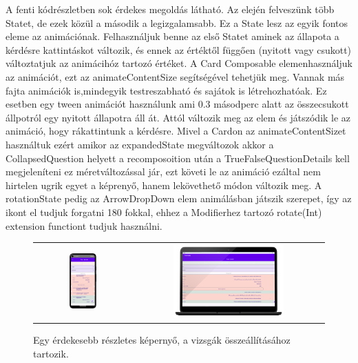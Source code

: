 A fenti kódrészletben sok érdekes megoldás látható.
Az elején felveszünk több Statet, de ezek közül a második a legizgalamsabb. Ez a State lesz az egyik fontos eleme az animációnak.
Felhasználjuk benne az első Statet aminek az állapota a kérdésre kattintáskot változik, és ennek az értéktől függően (nyitott vagy csukott) változtatjuk az animácihóz tartozó értéket.
A Card Composable elemenhasználjuk az animációt, ezt az animateContentSize segítségével tehetjük meg.
Vannak más fajta animációk is,mindegyik testreszabható és sajátok is létrehozhatóak. Ez esetben egy tween animációt használunk ami 0.3 másodperc alatt az összecsukott állpotról egy nyitott állapotra áll át.
Attól változik meg az elem és játszódik le az animáció, hogy rákattintunk a kérdésre.
Mivel a Cardon az animateContentSizet használtuk ezért amikor az expandedState megváltozok akkor a CollapsedQuestion helyett a recomposoition után a TrueFalseQuestionDetails kell megjeleníteni ez méretváltozással jár, ezt követi le az animáció ezáltal nem hirtelen ugrik egyet a képrenyő, hanem lekövethető módon változik meg.
A rotationState pedig az ArrowDropDown elem animálásban játszik szerepet, így az ikont el tudjuk forgatni 180 fokkal, ehhez a Modifierhez tartozó rotate(Int) extension functiont tudjuk használni.

\begin{figure}[!ht]
    \centering
    \begin{tabular}{cc}
        \includegraphics[width=0.3\textwidth, keepaspectratio]{figures/Details_Android.png} & 
        \includegraphics[width=0.6\textwidth, keepaspectratio]{figures/Details_Desktop_framed.png}
    \end{tabular}
    \caption{Egy érdekesebb részletes képernyő, a vizsgák összeállításához tartozik.}
    \label{fig:DetailsScreen}
\end{figure}


